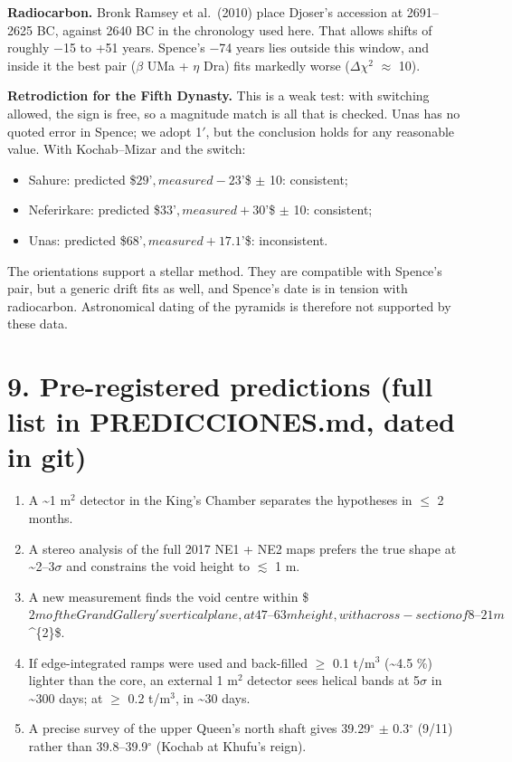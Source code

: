 \documentclass[
  11pt,
]{article}
\providecommand{\tightlist}{%
  \setlength{\itemsep}{0pt}\setlength{\parskip}{0pt}}
\begin{document}
\textbf{Radiocarbon.} Bronk Ramsey et al.~(2010) place Djoser's
accession at 2691--2625 BC, against 2640 BC in the chronology used here.
That allows shifts of roughly −15 to +51 years. Spence's −74 years lies
outside this window, and inside it the best pair (\(\beta\) UMa +
\(\eta\) Dra) fits markedly worse (\(\Delta\chi^{2}\) \(\approx\) 10).

\textbf{Retrodiction for the Fifth Dynasty.} This is a weak test: with
switching allowed, the sign is free, so a magnitude match is all that is
checked. Unas has no quoted error in Spence; we adopt 1\('\), but the
conclusion holds for any reasonable value. With Kochab--Mizar and the
switch:

\begin{itemize}
\tightlist
\item
  Sahure: predicted \$\pm\(29\)'\(, measured −23\)'\$ \(\pm\) 10:
  consistent;
\item
  Neferirkare: predicted \$\pm\(33\)'\(, measured +30\)'\$ \(\pm\) 10:
  consistent;
\item
  Unas: predicted \$\pm\(68\)'\(, measured +17.1\)'\$: inconsistent.
\end{itemize}

The orientations support a stellar method. They are compatible with
Spence's pair, but a generic drift fits as well, and Spence's date is in
tension with radiocarbon. Astronomical dating of the pyramids is
therefore not supported by these data.

\hypertarget{pre-registered-predictions-full-list-in-predicciones.md-dated-in-git}{%
\section{9. Pre-registered predictions (full list in PREDICCIONES.md,
dated in
git)}\label{pre-registered-predictions-full-list-in-predicciones.md-dated-in-git}}

\begin{enumerate}
\def\labelenumi{\arabic{enumi}.}
\tightlist
\item
  A \textasciitilde1 m\(^{2}\) detector in the King's Chamber separates
  the hypotheses in \(\leq\) 2 months.
\item
  A stereo analysis of the full 2017 NE1 + NE2 maps prefers the true
  shape at \textasciitilde2--3\(\sigma\) and constrains the void height
  to \(\lesssim\) 1 m.
\item
  A new measurement finds the void centre within
  \$\pm\(2 m of the Grand Gallery's vertical plane, at 47–63 m height, with a cross-section of 8–21 m\)\^{}\{2\}\$.
\item
  If edge-integrated ramps were used and back-filled \(\geq\) 0.1
  t/m\(^{3}\) (\textasciitilde4.5 \%) lighter than the core, an external
  1 m\(^{2}\) detector sees helical bands at 5\(\sigma\) in
  \textasciitilde300 days; at \(\geq\) 0.2 t/m\(^{3}\), in
  \textasciitilde30 days.
\item
  A precise survey of the upper Queen's north shaft gives
  39.29\(^\circ\) \(\pm\) 0.3\(^\circ\) (9/11) rather than
  39.8--39.9\(^\circ\) (Kochab at Khufu's reign).
\end{enumerate}
\end{document}
